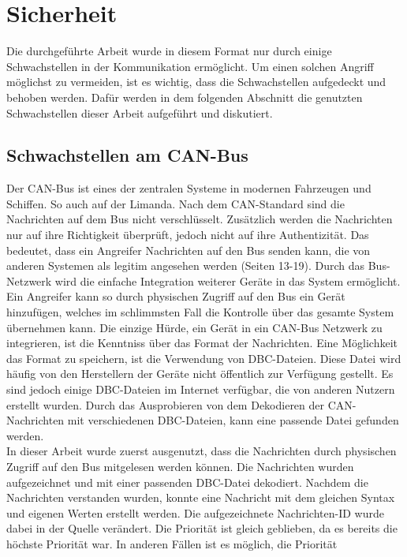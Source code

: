 \chapter{Sicherheit}

Die durchgeführte Arbeit wurde in diesem Format nur durch einige Schwachstellen in der Kommunikation ermöglicht.
Um einen solchen Angriff möglichst zu vermeiden, ist es wichtig, dass die Schwachstellen aufgedeckt und behoben werden.
Dafür werden in dem folgenden Abschnitt die genutzten Schwachstellen dieser Arbeit aufgeführt und diskutiert.

\section{Schwachstellen am CAN-Bus}
Der CAN-Bus ist eines der zentralen Systeme in modernen Fahrzeugen und Schiffen. So auch auf der Limanda.
Nach dem CAN-Standard sind die Nachrichten auf dem Bus nicht verschlüsselt. Zusätzlich werden die Nachrichten nur 
auf ihre Richtigkeit überprüft, jedoch nicht auf ihre Authentizität. Das bedeutet, dass ein Angreifer Nachrichten auf den Bus
senden kann, die von anderen Systemen als legitim angesehen werden \cite{Voss2008} (Seiten 13-19). Durch das Bus-Netzwerk wird die einfache Integration
weiterer
Geräte in das System ermöglicht. Ein Angreifer kann so durch physischen Zugriff auf den Bus ein Gerät hinzufügen, welches im schlimmsten Fall
die Kontrolle über das gesamte System übernehmen kann. Die einzige Hürde, ein Gerät in ein CAN-Bus Netzwerk zu integrieren, ist die
Kenntniss über das Format der Nachrichten. Eine Möglichkeit das Format zu speichern, ist die Verwendung von DBC-Dateien.
Diese Datei wird häufig von den Herstellern der Geräte nicht öffentlich zur Verfügung gestellt.
Es sind jedoch einige DBC-Dateien im Internet verfügbar, die von anderen Nutzern erstellt wurden. Durch das Ausprobieren von dem Dekodieren
der CAN-Nachrichten mit verschiedenen DBC-Dateien, kann eine passende Datei gefunden werden. \\
In dieser Arbeit wurde zuerst ausgenutzt, dass die Nachrichten durch physischen Zugriff auf den Bus mitgelesen werden können.
Die Nachrichten wurden aufgezeichnet und mit einer passenden DBC-Datei dekodiert. Nachdem die Nachrichten verstanden wurden, konnte
eine Nachricht mit dem gleichen Syntax und eigenen Werten erstellt werden. Die aufgezeichnete Nachrichten-ID wurde dabei in der Quelle 
verändert. Die Priorität ist gleich geblieben, da es bereits die höchste Priorität war. In anderen Fällen ist es möglich, die Priorität
